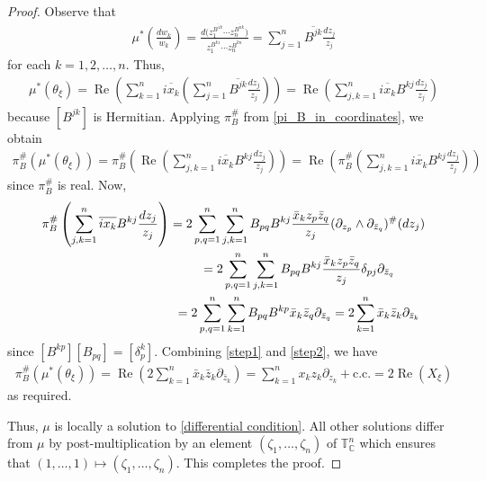 \documentclass[10pt,a4paper]{amsart}
\numberwithin{equation}{section}
\begin{document}
\begin{proof}
Observe that
\begin{gather*}
\mu^*\left(\frac{dw_k}{w_k}\right)=\frac{d\big(z_1^{\overline{B^{1k}}}\cdots z_n^{\overline{B^{nk}}}\big)}{z_1^{\overline{B^{k1}}}\cdots z_n^{\overline{B^{kn}}}}=\sum_{j=1}^n \overline{B^{jk}}\frac{dz_j}{z_{j}}
\end{gather*}
for each $k=1,2,\dots,n$. Thus,
\begin{gather*}
\mu^*(\theta_\xi)=\operatorname{Re}\left(\sum_{k=1}^n \overline{ix_k}\left(\sum_{j=1}^n \overline{B^{jk}}\frac{dz_j}{z_{j}}\right)\right)=\operatorname{Re}\left(\sum_{j,k=1}^n \overline{ix_k}B^{kj}\frac{dz_j}{z_{j}}\right)
\end{gather*}
because $[B^{jk}]$ is Hermitian. Applying $\pi_B^\#$ from \eqref{pi_B_in_coordinates}, we obtain
\begin{gather}
\pi_B^\#(\mu^*(\theta_\xi)) =\pi_B^\#\left(\operatorname{Re}\left(\sum_{j,k=1}^n \overline{ix_k}B^{kj}\frac{dz_j}{z_{j}} \right)\right)
=\operatorname{Re}\left(\pi_B^\#\left(\sum_{j,k=1}^n \overline{ix_k}B^{kj}\frac{dz_j}{z_{j}}\right)\right) \label{step1}
\end{gather}
since $\pi_B^\#$ is real. Now,
\begin{gather}
\pi_B^\#\left(\sum_{j,k=1}^n \overline{ix_k}B^{kj}\frac{dz_j}{z_{j}}\right)=2\sum_{p,q=1}^n \sum_{j,k=1}^n B_{pq}B^{kj}\frac{\bar{x}_k z_p \bar{z}_q}{z_j} (\partial_{z_p}\wedge \partial_{\bar{z}_q})^\#(dz_j) \nonumber \\
\hphantom{\pi_B^\#\left(\sum_{j,k=1}^n \overline{ix_k}B^{kj}\frac{dz_j}{z_{j}}\right)}{}
=2\sum_{p,q=1}^n \sum_{j,k=1}^n B_{pq}B^{kj}\frac{\bar{x}_k z_p \bar{z}_q}{z_j} \delta_{pj}\partial_{\bar{z}_q} \nonumber \\
\hphantom{\pi_B^\#\left(\sum_{j,k=1}^n \overline{ix_k}B^{kj}\frac{dz_j}{z_{j}}\right)}{}
=2\sum_{p,q=1}^n \sum_{k=1}^n B_{pq}B^{k p}\bar{x}_k\bar{z}_q\partial_{\bar{z}_q} =2\sum_{k=1}^n\bar{x}_k\bar{z}_k\partial_{\bar{z}_k} \label{step2}
\end{gather}
since $[B^{kp}][B_{pq}]=[\delta_p^k]$. Combining \eqref{step1} and \eqref{step2}, we have
\begin{gather*}
\pi_B^\#(\mu^*(\theta_\xi)) =\operatorname{Re}\left(2\sum_{k=1}^n\bar{x}_k\bar{z}_k\partial_{\bar{z}_k}\right)=\sum_{k=1}^n x_k z_k\partial_{z_k} +\text{c.c.} = 2\operatorname{Re} (X_\xi)
\end{gather*}
as required.

Thus, $\mu$ is locally a solution to \eqref{differential condition}. All other solutions dif\/fer from $\mu$ by post-multiplication by an element $(\zeta_1,\dots,\zeta_n)$ of ${\mathbb T}_{\mathbb C}^n$ which ensures that $(1,\dots,1)\mapsto (\zeta_1,\dots,\zeta_n)$. This completes the proof.
\end{proof}
\end{document}

